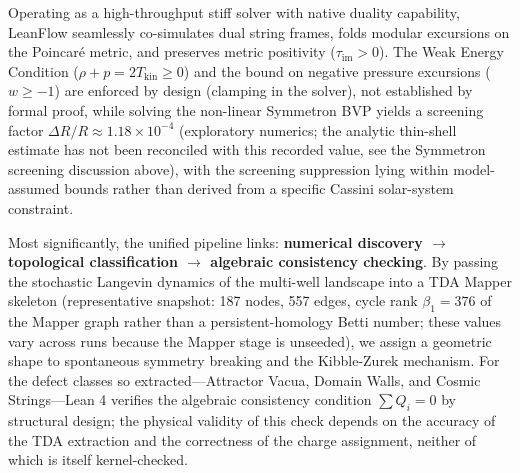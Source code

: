 \documentclass[11pt,a4paper]{article}
\newcommand{\numreconcile}[2]{#1}
\begin{document}
Operating as a high-throughput stiff solver with native duality capability, LeanFlow seamlessly co-simulates dual string frames, folds modular excursions on the Poincar\'e metric, and preserves metric positivity ($\tau_{\text{im}} > 0$). The Weak Energy Condition ($\rho + p = 2 T_{\text{kin}} \ge 0$) and the bound on negative pressure excursions ($w \ge -1$) are enforced by design (clamping in the solver), not established by formal proof, while solving the non-linear Symmetron BVP yields a screening factor $\Delta R/R \approx \numreconcile{1.18\times 10^{-4}}{\texttt{screening\_factor}}$ (exploratory numerics; the analytic thin-shell estimate has not been reconciled with this recorded value, see the Symmetron screening discussion above), with the screening suppression lying within model-assumed bounds rather than derived from a specific Cassini solar-system constraint.

Most significantly, the unified pipeline links: \textbf{numerical discovery $\to$ topological classification $\to$ algebraic consistency checking}. By passing the stochastic Langevin dynamics of the multi-well landscape into a TDA Mapper skeleton (representative snapshot: \numreconcile{187}{Mapper nodes} nodes, \numreconcile{557}{Mapper edges} edges, cycle rank $\beta_1 = \numreconcile{376}{cycle rank}$ of the Mapper graph rather than a persistent-homology Betti number; these values vary across runs because the Mapper stage is unseeded), we assign a geometric shape to spontaneous symmetry breaking and the Kibble-Zurek mechanism. For the defect classes so extracted—Attractor Vacua, Domain Walls, and Cosmic Strings—Lean 4 verifies the algebraic consistency condition $\sum Q_i = 0$ by structural design; the physical validity of this check depends on the accuracy of the TDA extraction and the correctness of the charge assignment, neither of which is itself kernel-checked.
\end{document}
